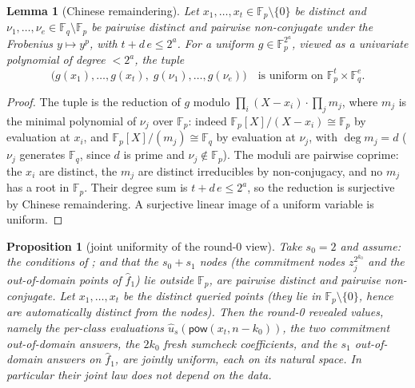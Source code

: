 \documentclass{article}
\newcommand{\Fp}{\mathbb{F}_p}
\newcommand{\Fq}{\mathbb{F}_q}
\newcommand{\extdeg}{d}
\newcommand{\pow}{\mathsf{pow}}
\newtheorem{lemma}{Lemma}
\newtheorem{proposition}{Proposition}
\theoremstyle{definition}
\begin{document}
\begin{lemma}[Chinese remaindering]\label{lem:crt}
Let $x_1, \dots, x_{t} \in \Fp \setminus \{0\}$ be distinct and $\nu_1, \dots, \nu_e \in \Fq \setminus \Fp$ be pairwise distinct and pairwise non-conjugate under the Frobenius $y \mapsto y^p$, with $t + \extdeg\, e \leq 2^a$. For a uniform $g \in \Fp^{2^a}$, viewed as a univariate polynomial of degree $< 2^a$, the tuple
\[
\big(g(x_1), \dots, g(x_{t}),\; g(\nu_1), \dots, g(\nu_e)\big) \quad \text{is uniform on } \Fp^{t} \times \Fq^{e} .
\]
\end{lemma}

\begin{proof}
The tuple is the reduction of $g$ modulo $\prod_i (X - x_i) \cdot \prod_j m_j$, where $m_j$ is the minimal polynomial of $\nu_j$ over $\Fp$: indeed $\Fp[X]/(X - x_i) \cong \Fp$ by evaluation at $x_i$, and $\Fp[X]/(m_j) \cong \Fq$ by evaluation at $\nu_j$, with $\deg m_j = \extdeg$ ($\nu_j$ generates $\Fq$, since $\extdeg$ is prime and $\nu_j \notin \Fp$). The moduli are pairwise coprime: the $x_i$ are distinct, the $m_j$ are distinct irreducibles by non-conjugacy, and no $m_j$ has a root in $\Fp$. Their degree sum is $t + \extdeg\, e \leq 2^a$, so the reduction is surjective by Chinese remaindering. A surjective linear image of a uniform variable is uniform.
\end{proof}

\begin{proposition}[joint uniformity of the round-0 view]\label{prop:uniform}
Take $s_0 = 2$ and assume: the conditions of ; and that the $s_0 + s_1$ nodes (the commitment nodes $z_j^{2^{k_0}}$ and the out-of-domain points of $\hat{f}_1$) lie outside $\Fp$, are pairwise distinct and pairwise non-conjugate. Let $x_1, \dots, x_{t}$ be the distinct queried points (they lie in $\Fp \setminus \{0\}$, hence are automatically distinct from the nodes). Then the round-0 revealed values, namely the per-class evaluations $\hat{u}_s(\pow(x_t, n - k_0))$, the two commitment out-of-domain answers, the $2k_0$ fresh sumcheck coefficients, and the $s_1$ out-of-domain answers on $\hat{f}_1$, are jointly uniform, each on its natural space. In particular their joint law does not depend on the data.
\end{proposition}
\end{document}
